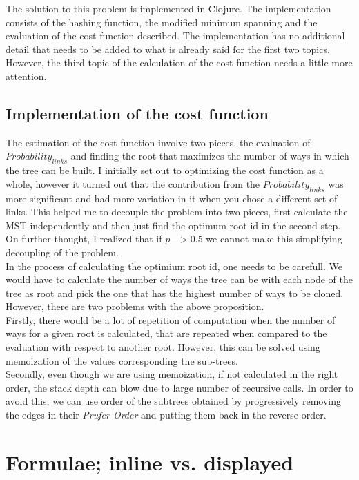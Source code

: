 \documentclass[12pt]{article}
\begin{document}
The solution to this problem is implemented in Clojure. The implementation consists of the hashing function, the modified minimum spanning and the evaluation of the cost function described. The implementation has no additional detail that needs to be added to what is already said for the first two topics. However, the third topic of the calculation of the cost function needs a little more  attention.

\subsection{Implementation of the cost function}
The estimation of the cost function involve two pieces, the evaluation of $Probability_{links}$ and finding the root that maximizes the number of ways in which the tree can be built. I initially set out to optimizing the cost function as a whole, however it turned out that the contribution from the $Probability_{links}$ was more significant and had more variation in it when you chose a different set of links. This helped me to decouple the problem into two pieces, first calculate the MST independently and then just find the optimum root id in the second step. On further thought, I realized that if $p->0.5$ we cannot make this simplifying decoupling of the problem.\\
In the process of calculating the optimium root id, one needs to be carefull. We would have to calculate the number of ways the tree can be with each node of the tree as root and pick the one that has the highest number of ways to be cloned. However, there are two problems with the above proposition. \\
 Firstly, there would be a lot of repetition of computation when the number of ways for a given root is calculated, that are repeated when compared to the evaluation with respect to another root. However, this can be solved using memoization of the values corresponding the sub-trees. \\
Secondly, even though we are using memoization, if not calculated in the right order, the stack depth can blow due to large number of recursive calls. In order to avoid this, we can use order of the subtrees obtained by progressively removing the edges in their \emph{Prufer Order} and putting them back in the reverse order.

\section{Formulae; inline vs. displayed}
\end{document}
